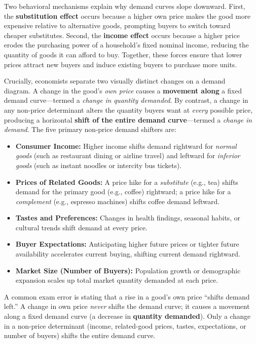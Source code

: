 \documentclass[11pt,letterpaper]{article}
\begin{document}
Two behavioral mechanisms explain why demand curves slope downward. First, the \textbf{substitution effect} occurs because a higher own price makes the good more expensive relative to alternative goods, prompting buyers to switch toward cheaper substitutes. Second, the \textbf{income effect} occurs because a higher price erodes the purchasing power of a household's fixed nominal income, reducing the quantity of goods it can afford to buy. Together, these forces ensure that lower prices attract new buyers and induce existing buyers to purchase more units.

Crucially, economists separate two visually distinct changes on a demand diagram. A change in the good's \emph{own price} causes a \textbf{movement along} a fixed demand curve—termed a \emph{change in quantity demanded}. By contrast, a change in any non-price determinant alters the quantity buyers want at \emph{every} possible price, producing a horizontal \textbf{shift of the entire demand curve}—termed a \emph{change in demand}. The five primary non-price demand shifters are:
\begin{itemize}
  \item \textbf{Consumer Income:} Higher income shifts demand rightward for \emph{normal goods} (such as restaurant dining or airline travel) and leftward for \emph{inferior goods} (such as instant noodles or intercity bus tickets).
  \item \textbf{Prices of Related Goods:} A price hike for a \emph{substitute} (e.g., tea) shifts demand for the primary good (e.g., coffee) rightward; a price hike for a \emph{complement} (e.g., espresso machines) shifts coffee demand leftward.
  \item \textbf{Tastes and Preferences:} Changes in health findings, seasonal habits, or cultural trends shift demand at every price.
  \item \textbf{Buyer Expectations:} Anticipating higher future prices or tighter future availability accelerates current buying, shifting current demand rightward.
  \item \textbf{Market Size (Number of Buyers):} Population growth or demographic expansion scales up total market quantity demanded at each price.
\end{itemize}

\begin{coreprinciple}
A common exam error is stating that a rise in a good's own price ``shifts demand left.'' A change in own price \emph{never} shifts the demand curve; it causes a movement along a fixed demand curve (a decrease in \textbf{quantity demanded}). Only a change in a non-price determinant (income, related-good prices, tastes, expectations, or number of buyers) shifts the entire demand curve.
\end{coreprinciple}
\end{document}
